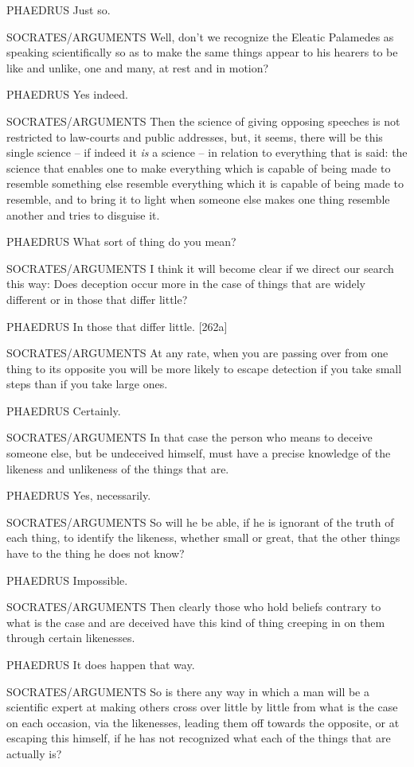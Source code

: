  PHAEDRUS Just so.

SOCRATES/ARGUMENTS Well, don't we recognize the Eleatic Palamedes as
speaking scientifically so as to make the same things appear to his
hearers to be like and unlike, one and many, at rest and in
motion?

PHAEDRUS Yes indeed.

SOCRATES/ARGUMENTS Then the science of giving opposing 
speeches is not restricted to law-courts and public addresses, 
but, it seems, there will be this single science -- if indeed it
{\em is} a science -- in relation to everything that is said: the
science that enables one to make everything which is capable of being
made to resemble something else resemble everything which it is capable
of being made to resemble, and to bring it to light when someone else
makes one thing resemble another and tries to disguise it.

PHAEDRUS What sort of thing do you mean? 

SOCRATES/ARGUMENTS I think it will become clear if we direct our search
this way: Does deception occur more in the case of things that are
widely different or in those that differ little?

PHAEDRUS In those that differ little. {[}262a{]}

SOCRATES/ARGUMENTS At any rate, when you are passing over from one thing
to its opposite you will be more likely to escape detection if you take
small steps than if you take large ones.

PHAEDRUS Certainly.

SOCRATES/ARGUMENTS In that case the person who means to  deceive
someone else, but be undeceived himself, must have a precise knowledge
of the likeness and unlikeness of the things that
are.

PHAEDRUS Yes, necessarily.

SOCRATES/ARGUMENTS So will he be able, if he is ignorant of the truth of
each thing, to identify the likeness, whether small or  great,
that the other things have to the thing he does not know?

PHAEDRUS Impossible. 

SOCRATES/ARGUMENTS Then clearly those who hold beliefs contrary to what
is the case and are deceived have this kind of thing creeping in on them
through certain likenesses.

PHAEDRUS It does happen that way.

SOCRATES/ARGUMENTS So is there any way in which a man  will be a
scientific expert at making others cross over little by little from what
is the case on each occasion, via the likenesses, leading them off
towards the opposite, or at escaping this himself, if he has not
recognized what each of the things that are actually is?

